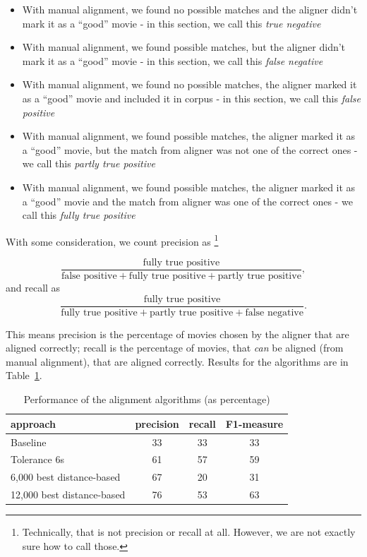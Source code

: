 \begin{itemize}
    \item With manual alignment, we found no possible matches and the aligner didn't mark it as a ``good'' movie - in this section, we call this \textit{true negative}
    \item With manual alignment, we found possible matches, but the aligner didn't mark it as a ``good'' movie - in this section, we call this \textit{false negative}
    \item With manual alignment, we found no possible matches, the aligner marked it as a ``good'' movie and included it in corpus - in this section, we call this \textit{false positive}
    \item With manual alignment, we found possible matches, the aligner marked it as a ``good'' movie, but the match from aligner was not one of the correct ones -  we call this \textit{partly true positive}
    \item  With manual alignment, we found possible matches, the aligner marked it as a ``good'' movie and the match from aligner was  one of the correct ones -  we call this \textit{fully true positive}
\end{itemize}

With some consideration, we count precision as \footnote{Technically, that is not precision or recall at all. However, we are not exactly sure how to call those.}

$$\frac{\text{fully true positive}}{\text{false positive}+\text{fully true positive}+\text{partly true positive}},$$ and recall as $$\frac{\text{fully true positive}}{\text{fully true positive}+\text{partly true positive}+\text{false negative}}.$$

This means precision is the percentage of movies chosen by the aligner that are aligned correctly; recall is the percentage of movies, that \emph{can} be aligned (from manual alignment), that are aligned correctly. Results for the algorithms are in Table~\ref{align_score}.

\begin{table}[h]
\begin{center}
\begin{tabular}{|l|c|c|c|} 
    \hline
    \textbf{approach} & \textbf{precision} & \textbf{recall} & \textbf{F1-measure} \\ \hline
    Baseline & 33 & 33 & 33 \\ \hline
    Tolerance 6s & 61 & 57 & 59 \\ \hline
    6,000 best distance-based & 67 & 20 & 31 \\ \hline
    12,000 best distance-based & 76 & 53 & 63 \\ \hline
\end{tabular}
\end{center}

\caption{Performance of the alignment algorithms (as percentage)}\label{align_score}
\end{table}

